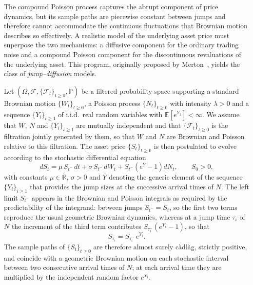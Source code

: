 The compound Poisson process captures the abrupt component of price
dynamics, but its sample paths are piecewise constant between jumps
and therefore cannot accommodate the continuous fluctuations that
Brownian motion describes so effectively. A realistic model of the
underlying asset price must superpose the two mechanisms: a diffusive
component for the ordinary trading noise and a compound Poisson
component for the discontinuous revaluations of the underlying
asset. This program, originally proposed by
Merton~\cite{Merton1976}, yields the class of \emph{jump--diffusion} models.

Let $(\Omega, \mathcal{F}, \{\mathcal{F}_t\}_{t\geq 0}, \mathbb{P})$
be a filtered probability space supporting
a standard Brownian motion $\{W_t\}_{t\geq 0}$, a Poisson process
$\{N_t\}_{t\geq 0}$ with intensity $\lambda > 0$ and a sequence
$\{Y_i\}_{i\geq 1}$ of i.i.d.\ real random variables with
$\mathbb{E}[e^{Y_1}] < \infty$. We assume that $W$, $N$ and
$\{Y_i\}_{i\geq 1}$ are mutually independent and that
$\{\mathcal{F}_t\}_{t\geq 0}$ is the filtration jointly generated by
them, so that $W$ and $N$ are Brownian and Poisson relative to this
filtration.
The asset price $\{S_t\}_{t\geq 0}$ is then postulated to evolve
according to the stochastic differential equation
\begin{equation}\label{eq:jumpdiff_SDE}
    dS_t = \mu\, S_{t^-}\, dt + \sigma\, S_{t^-}\, dW_t
         + S_{t^-}\!\left(e^{Y} - 1\right) dN_t,
    \qquad S_0 > 0,
\end{equation}
with constants $\mu \in \mathbb{R}$, $\sigma > 0$ and $Y$ denoting the
generic element of the sequence $\{Y_i\}_{i\geq 1}$ that provides the
jump sizes at the successive arrival times of $N$. The left limit
$S_{t^-}$ appears in the Brownian and Poisson integrals as required
by the predictability of the integrand: between jumps
$S_{t^-} = S_t$, so the first two terms reproduce the usual geometric
Brownian dynamics, whereas at a jump time $\tau_i$ of $N$ the
increment of the third term contributes $S_{\tau_i^-}(e^{Y_i} - 1)$,
so that
\[
    S_{\tau_i} = S_{\tau_i^-}\, e^{Y_i}.
\]
The sample paths of $\{S_t\}_{t\geq 0}$ are therefore almost surely
c\`adl\`ag, strictly positive, and coincide with a geometric Brownian
motion on each stochastic interval between two consecutive arrival
times of $N$; at each arrival time they are multiplied by the
independent random factor $e^{Y_i}$.


